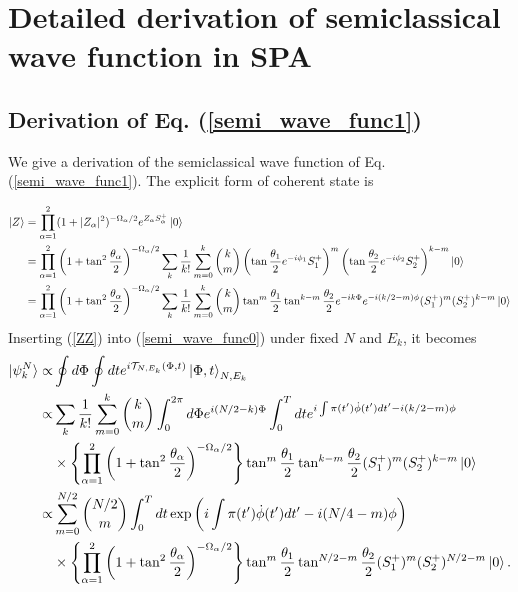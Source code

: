 \documentclass[11pt]{book} %
\begin{document}
\clearpage{\pagestyle{empty}\cleardoublepage}
\chapter{Detailed derivation of semiclassical wave function in SPA}
\section{Derivation of Eq. (\ref{semi_wave_func1})}
\label{wave_func1}

We give a derivation of the semiclassical wave function
of Eq. (\ref{semi_wave_func1}).
The explicit form of coherent state is

\begin{align}
  \ket{Z} &= \prod_{\alpha=1}^2(1+|Z_{\alpha}|^2)^{-\Omega_{\alpha}/2}e^{Z_{\alpha}S_{\alpha}^{+}}\ket{0} \nonumber \\
  &= \prod_{\alpha=1}^2\left(1+\tan^2{\frac{\theta_{\alpha}}{2}}\right)^{-\Omega_{\alpha}/2} \sum_k \frac{1}{k!} \sum_{m=0}^k
  \binom{k}{m} \left(
  \tan{\frac{\theta_1}{2}}e^{-i\phi_1}S_1^{+} \right)^m \left(
  \tan{\frac{\theta_2}{2}}e^{-i\phi_2}S_2^{+} \right)^{k-m} \ket{0} \nonumber \\
  &= \prod_{\alpha=1}^2\left(1+\tan^2{\frac{\theta_{\alpha}}{2}}\right)^{-\Omega_{\alpha}/2} \sum_k \frac{1}{k!} \sum_{m=0}^k
  \binom{k}{m} \tan^m{\frac{\theta_1}{2}}\tan^{k-m}{\frac{\theta_2}{2}}e^{-ik\Phi}e^{-i(k/2-m)\phi}
  (S_1^{+})^m(S_2^{+})^{k-m} \ket{0}
  \label{ZZ}
\end{align}
Inserting (\ref{ZZ}) into (\ref{semi_wave_func0}) under fixed $N$ and $E_k$,
it becomes
\begin{align}
	\ket{\psi_k^N} \propto& \oint d\Phi \oint dt
	e^{i\mathcal{T}_{N,E_k}(\Phi, t)}
	\ket{\Phi,t}_{N,E_k} \nonumber \\
  \propto& \sum_k \frac{1}{k!} \sum_{m=0}^k \binom{k}{m} \int_0^{2\pi} d\Phi e^{i(N/2-k)\Phi} 
  \int_0^T dt e^{i\int \pi(t') \dot{\phi}(t') dt'-i(k/2-m)\phi} \nonumber \\
  &\times \left\{ \prod_{\alpha=1}^2\left(1+\tan^2{\frac{\theta_{\alpha}}{2}}\right)^{-\Omega_{\alpha}/2} \right\}
\tan^m{\frac{\theta_1}{2}}\tan^{k-m}\frac{\theta_2}{2}(S_1^{+})^m(S_2^{+})^{k-m} \ket{0} \nonumber \\
  \propto& \sum_{m=0}^{N/2} \binom{N/2}{m} \int_0^T dt \exp{\left( i\int \pi(t') \dot{\phi}(t') dt'-i(N/4-m)\phi \right)} \nonumber \\
  &\times \left\{ \prod_{\alpha=1}^2\left(1+\tan^2{\frac{\theta_{\alpha}}{2}}\right)^{-\Omega_{\alpha}/2} \right\} 
\tan^m{\frac{\theta_1}{2}}\tan^{N/2-m}\frac{\theta_2}{2} (S_1^{+})^m(S_2^{+})^{N/2-m} \ket{0} . \label{semi_wave_func_b}
\end{align}
\end{document}

